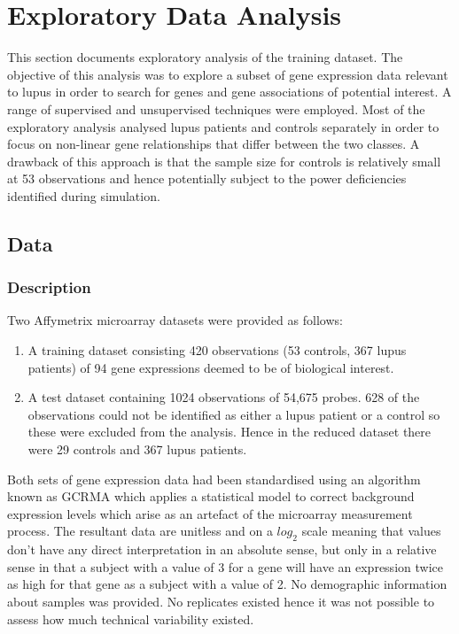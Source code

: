 \documentclass[a4paper, 12pt]{report}
\begin{document}
\chapter{Exploratory Data Analysis} 
This section documents exploratory analysis of the training dataset. The objective of this analysis was to explore a subset of gene expression data relevant to lupus in order to search for genes and gene associations of potential interest. A range of supervised and unsupervised techniques were employed. Most of the exploratory analysis analysed lupus patients and controls separately in order to focus on non-linear gene relationships that differ between the two classes. A drawback of this approach is that the sample size for controls is relatively small at 53 observations and hence potentially subject to the power deficiencies identified during simulation. %


\section{Data} 

\subsection*{Description}
Two Affymetrix microarray datasets were provided as follows:

\begin{enumerate}
\item A training dataset consisting 420 observations (53 controls, 367 lupus patients) of 94 gene expressions deemed to be of biological interest.
\item A test dataset containing 1024 observations of 54,675 probes. 628 of the observations could not be identified as either a lupus patient or a control so these were excluded from the analysis. Hence in the reduced dataset there were 29 controls and 367 lupus patients.
\end{enumerate}

Both sets of gene expression data had been standardised using an algorithm known as GCRMA \cite{GCRMA} which applies a statistical model to correct background expression levels which arise as an artefact of the microarray measurement process. The resultant data are unitless and on a $log_2$ scale meaning that values don't have any direct interpretation in an absolute sense, but only in a relative sense in that a subject with a value of 3 for a gene will have an expression twice as high for that gene as a subject with a value of 2. No demographic information about samples was provided. No replicates existed hence it was not possible to assess how much technical variability existed.
\end{document}
